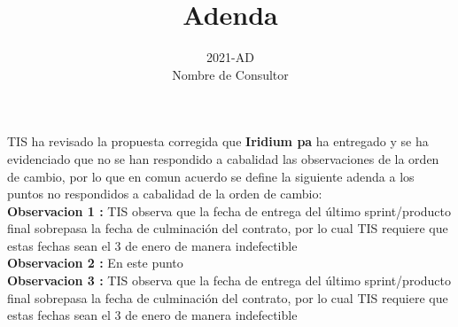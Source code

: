 \documentclass[10pt,letterpaper]{article}
\title{Adenda}
\author{2021-AD\\{Nombre de Consultor}}
\date{}
\begin{document}
\maketitle


TIS ha revisado la propuesta corregida que \textbf{Iridium pa} ha entregado y se ha evidenciado que no se han
respondido a cabalidad las observaciones de la orden de cambio, por lo que en comun acuerdo se define la
siguiente adenda a los puntos no respondidos a cabalidad de la orden de cambio:\\

\textbf{Observacion 1 :} TIS observa que la fecha de entrega del último sprint/producto final sobrepasa la fecha
de culminación del contrato, por lo cual TIS requiere que estas fechas sean el 3 de enero de manera
indefectible\\

 \textbf{Observacion 2 :} En este punto\\

 \textbf{Observacion 3 :} TIS observa que la fecha de entrega del último sprint/producto final sobrepasa la fecha
de culminación del contrato, por lo cual TIS requiere que estas fechas sean el 3 de enero de manera
indefectible\\

 
\end{document}
